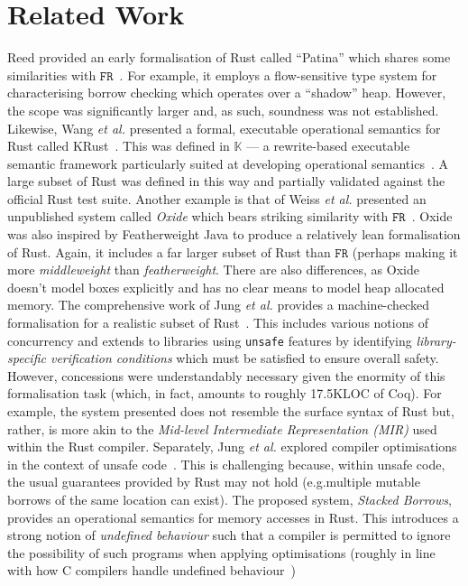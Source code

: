 \newcommand{\FR}{}
\def\FR/{$\mathtt{FR}$}


\section{Related Work}


Reed provided an early formalisation of Rust called ``Patina'' which
shares some similarities with \FR/~\cite{Reed15}.  For example, it
employs a flow-sensitive type system for characterising borrow
checking which operates over a ``shadow'' heap.  However, the scope
was significantly larger and, as such, soundness was not established.
Likewise, Wang {\em et al.} presented a formal, executable operational
semantics for Rust called KRust~\cite{WSZZZ18}.  This was defined in
$\mathbb{K}$ --- a rewrite-based executable semantic framework
particularly suited at developing operational semantics~\cite{RS10b}.
A large subset of Rust was defined in this way and partially validated
against the official Rust test suite.  Another example is that of
Weiss {\em et al.} presented an unpublished system called {\em Oxide}
which bears striking similarity with \FR/~\cite{WPMA19}.  Oxide was
also inspired by Featherweight Java to produce a relatively lean
formalisation of Rust.  Again, it includes a far larger subset of Rust
than \FR/ (perhaps making it more {\em middleweight} than {\em
  featherweight}.  There are also differences, as Oxide doesn't model
boxes explicitly and has no clear means to model heap allocated
memory.  The comprehensive work of Jung {\em et al.} provides a
machine-checked formalisation for a realistic subset of
Rust~\cite{JJKD18}.  This includes various notions of concurrency and
extends to libraries using \lstinline{unsafe} features by identifying
{\em library-specific verification conditions} which must be satisfied
to ensure overall safety.  However, concessions were understandably
necessary given the enormity of this formalisation task (which, in
fact, amounts to roughly 17.5KLOC of Coq).  For example, the system
presented does not resemble the surface syntax of Rust but, rather, is
more akin to the {\em Mid-level Intermediate Representation (MIR)}
used within the Rust compiler.  Separately, Jung {\em et al.} explored
compiler optimisations in the context of unsafe code~\cite{JDKJD20}.
This is challenging because, within unsafe code, the usual guarantees
provided by Rust may not hold (e.g.multiple mutable borrows of the
same location can exist).  The proposed system, {\em Stacked Borrows},
provides an operational semantics for memory accesses in Rust.  This
introduces a strong notion of {\em undefined behaviour} such that a
compiler is permitted to ignore the possibility of such programs when
applying optimisations (roughly in line with how C compilers handle
undefined behaviour~\cite{MGDKRWS19})


